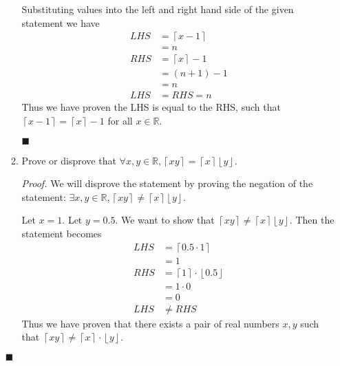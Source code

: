 \documentclass{article}
\newcommand\qedsymbol{\hfill$\blacksquare$}
\begin{document}
\begin{enumerate}[label=(\alph*)]
\begin{enumerate}[label=(\roman*)]
            Substituting values into the left and right 
            hand side of the given statement we have 
            \begin{align*}
                LHS &= \left\lceil x - 1 \right\rceil \tag*{(By $\left\lceil x - 1
                \right\rceil = n$)} \\
                    &= n  \\
                RHS &= \left\lceil x \right\rceil - 1 \tag*{(By $\left\lceil x 
                \right\rceil = n + 1 $)}\\
                    &= (n+1) - 1\\
                    &= n \\
                LHS &= RHS = n 
            \end{align*}
            Thus we have proven the LHS is equal to the RHS, such that 
            $\left\lceil x - 1 \right\rceil  = \left\lceil x \right\rceil - 1$ 
            for all $x \in \mathbb{R}$. 

            \qedsymbol

        \item Prove or disprove that $\forall x, y \in \mathbb{R}, \left\lceil 
            xy\right\rceil = \left\lceil x \right\rceil \left\lfloor 
            y\right\rfloor$. 
            
            \textit{Proof.} We will disprove the statement by proving the 
            negation of the statement:
            $\exists x, y \in \mathbb{R}, \left\lceil xy \right\rceil 
            \neq \left\lceil x \right\rceil \left\lfloor y \right\rfloor$.

            Let $x = 1$. Let $y = 0.5$. We want to show that $\left\lceil 
            xy\right\rceil \neq \left\lceil x \right\rceil \left\lfloor y \right\rfloor $.
            Then the statement becomes 
            \begin{align*}
                LHS &= \left\lceil 0.5 \cdot 1\right\rceil \\
                    &= 1 \\
            RHS &= \left\lceil 1 \right\rceil \cdot \left\lfloor 0.5 \right\rfloor  \\
                &= 1 \cdot 0 \\
                &= 0 \\
            LHS &\neq RHS 
            \end{align*}
            Thus we have proven that there exists a pair of real numbers 
            $x, y$ such that $\left\lceil xy \right\rceil \neq \left\lceil 
            x\right\rceil \cdot \left\lfloor y \right\rfloor $. 
    \end{enumerate}
    \qedsymbol
\end{enumerate}
\end{document}
